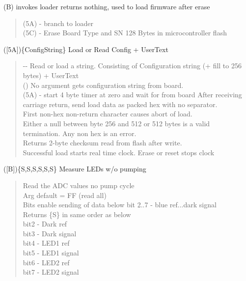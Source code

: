{ (B) invokes loader returns nothing, used to load firmware
after erase}
\begin{quote}
	(5A) - branch to loader\\
	(5C) - Erase Board Type and SN 128 Bytes in microcontroller flash\\
\end{quote}

\label{sec:Lcommand}
{ ({[}5A{]})\{ConfigString\} Load or Read Config + UserText}
\begin{quote}
	-\/- Read or load a string. Consisting of Configuration string (+ fill to
	256 bytes) + UserText\\
	() No argument gets configuration string from board.\\
	(5A) - start 4 byte timer at zero and wait for  from board
	After receiving carriage return, send load data as packed hex with no
	separator.\\
	First non-hex non-return character causes abort of load.\\
	Either a null between byte 256 and 512 or 512 bytes is a valid\\
	termination. Any non hex is an error.\\
	Returns 2-byte checksum read from flash after write.\\
	Successful load starts real time clock. Erase or reset stops clock\\
\end{quote}

{ ({[}B{]})\{S,S,S,S,S,S\} Measure LEDs w/o pumping}
\begin{quote}
	Read the ADC values no pump cycle\\
	Arg default = FF (read all)\\
	Bits enable sending of data below bit 2..7 - blue ref...dark signal\\
	Returns \{S\} in same order as below\\
	bit2 - Dark ref\\
	bit3 - Dark signal\\
	bit4 - LED1 ref\\
	bit5 - LED1 signal\\
	bit6 - LED2 ref\\
	bit7 - LED2 signal\\
\end{quote}

